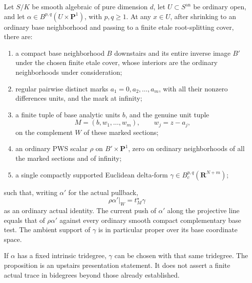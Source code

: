 \begin{proposition}
\label{r15ad:presenter}
Let $S/K$ be smooth algebraic of pure dimension $d$,
let $U\subset S^{\mathrm{an}}$ be ordinary open, and
let $\alpha\in B^{p,q}(U\times\mathbf P^1)$, with
$p,q\geq1$.  At any $x\in U$, after shrinking to an
ordinary base neighborhood and passing to a finite
etale root-splitting cover, there are:
\begin{enumerate}
\item a compact base neighborhood $B$ downstairs and its
entire inverse image $B'$ under the chosen finite etale
cover, whose interiors are the ordinary neighborhoods
under consideration;
\item regular pairwise distinct marks
$a_1=0,a_2,\ldots,a_m$, with all their nonzero
differences units, and the mark at infinity;
\item a finite tuple of base analytic units $b$, and
the genuine unit tuple
\[
             M=(b,w_1,\ldots,w_m),\qquad w_j=z-a_j,
\tag{AD15.2}\label{r15ad:moment}
\]
on the complement $W$ of these marked sections;
\item an ordinary PWS scalar $\rho$ on
$B'\times\mathbf P^1$, zero on ordinary neighborhoods
of all the marked sections and of infinity;
\item a single compactly supported Euclidean delta-form
$\gamma\in B^{p,q}_c(\mathbf R^{N+m})$;
\end{enumerate}
such that, writing $\alpha'$ for the actual pullback,
\[
                    \rho\alpha'|_W=t_M^\star\gamma
\tag{AD15.3}\label{r15ad:actual-presenter}
\]
as an ordinary actual identity.  The current push of
$\alpha'$ along the projective line equals that of
$\rho\alpha'$ against every ordinary smooth compact
complementary base test.  The ambient support of
$\gamma$ is in particular proper over its base
coordinate space.

If $\alpha$ has a fixed intrinsic tridegree, $\gamma$
can be chosen with that same tridegree.  The proposition
is an upstairs presentation statement.  It does not
assert a finite actual trace in bidegrees beyond those
already established.
\end{proposition}

